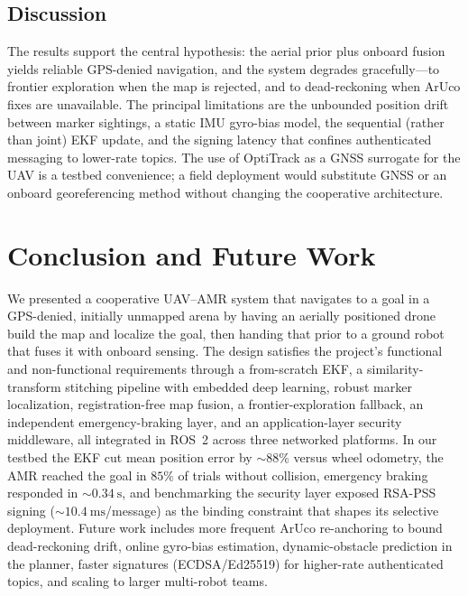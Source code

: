 \documentclass[conference]{IEEEtran}
\begin{document}
\subsection{Discussion}
The results support the central hypothesis: the aerial prior plus onboard fusion
yields reliable GPS-denied navigation, and the system degrades gracefully---to
frontier exploration when the map is rejected, and to dead-reckoning when ArUco
fixes are unavailable. The principal limitations are the unbounded position drift
between marker sightings, a static IMU gyro-bias model, the sequential (rather than
joint) EKF update, and the signing latency that confines authenticated messaging to
lower-rate topics. The use of OptiTrack as a GNSS surrogate for the UAV is a
testbed convenience; a field deployment would substitute GNSS or an onboard
georeferencing method without changing the cooperative architecture.

\section{Conclusion and Future Work}
\label{sec:conclusion}
We presented a cooperative UAV--AMR system that navigates to a goal in a
GPS-denied, initially unmapped arena by having an aerially positioned drone build
the map and localize the goal, then handing that prior to a ground robot that
fuses it with onboard sensing. The design satisfies the project's functional and
non-functional requirements through a from-scratch EKF, a similarity-transform
stitching pipeline with embedded deep learning, robust marker localization,
registration-free map fusion, a frontier-exploration fallback, an independent
emergency-braking layer, and an application-layer security middleware, all
integrated in ROS~2 across three networked platforms. In our testbed the EKF cut
mean position error by ${\sim}88\%$ versus wheel odometry, the AMR reached the goal
in $85\%$ of trials without collision, emergency braking responded in
${\sim}\SI{0.34}{\second}$, and benchmarking the security layer exposed RSA-PSS
signing (${\sim}\SI{10.4}{\milli\second}$/message) as the binding constraint that
shapes its selective deployment. Future work includes more frequent ArUco
re-anchoring to bound dead-reckoning drift, online gyro-bias estimation,
dynamic-obstacle prediction in the planner, faster signatures (ECDSA/Ed25519) for
higher-rate authenticated topics, and scaling to larger multi-robot teams.
\end{document}
